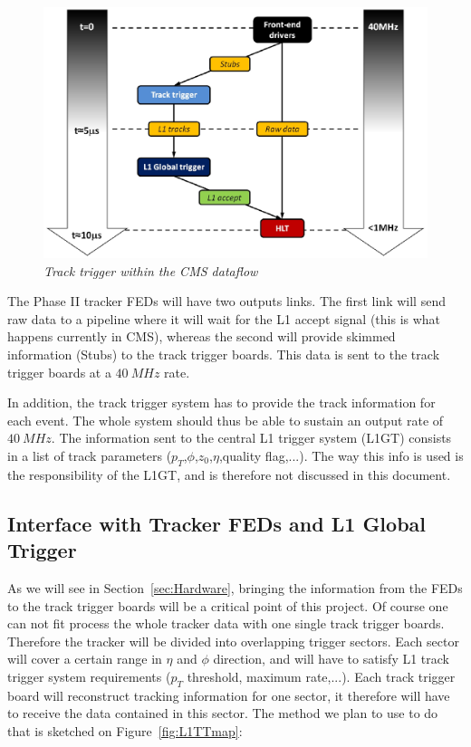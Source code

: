 \begin{figure}[ht!]
\centering
\includegraphics[width=0.6\columnwidth]{Plots/TTintegration.eps}
\caption{\emph{Track trigger within the CMS dataflow}}
\label{fig:L1TTinteg}
\end{figure}

\noindent The Phase II tracker FEDs will have two outputs links. The first link will send raw data to a pipeline where it will wait for the L1 accept signal (this is what happens currently in CMS), whereas the second will provide skimmed information (Stubs) to the track trigger boards. This data is sent to the track trigger boards at a $40~MHz$ rate. 

\noindent In addition, the track trigger system has to provide the track information for each event. The whole system should thus be able to sustain an output rate of $40~MHz$. The information sent to the central L1 trigger system (L1GT) consists in a list of track parameters ($p_T$,$\phi$,$z_0$,$\eta$,quality flag,...). The way this info is used is the responsibility of the L1GT, and is therefore not discussed in this document. 

\subsection{Interface with Tracker FEDs and L1 Global Trigger}

\noindent As we will see in Section~\ref{sec:Hardware}, bringing the information from the FEDs to the track trigger boards will be a critical point of this project. Of course one can not fit process the whole tracker data with one single track trigger boards. Therefore the tracker will be divided into overlapping trigger sectors. Each sector will cover a certain range in $\eta$ and $\phi$ direction, and will have to satisfy L1 track trigger system requirements ($p_T$ threshold, maximum rate,...). Each track trigger board will reconstruct tracking information for one sector, it therefore will have to receive the data contained in this sector. The method we plan to use to do that is sketched on Figure~\ref{fig:L1TTmap}: 

